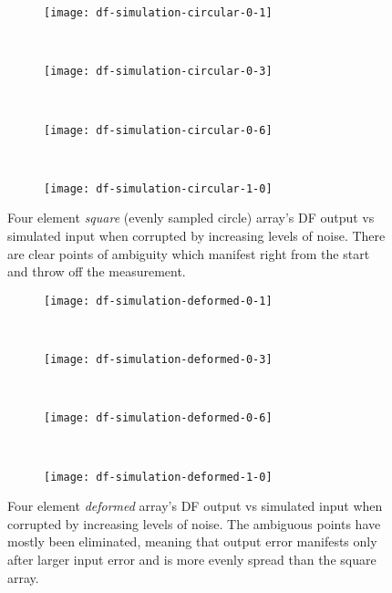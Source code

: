 \begin{figure}
  \begin{subfigure}{\textwidth}
    \centering
    \texttt{[image: df-simulation-circular-0-1]}
  \end{subfigure}\\[1em]
  \begin{subfigure}{\textwidth}
    \centering
    \texttt{[image: df-simulation-circular-0-3]}
  \end{subfigure}\\[1em]
  \begin{subfigure}{\textwidth}
    \centering
    \texttt{[image: df-simulation-circular-0-6]}
  \end{subfigure}\\[1em]
  \begin{subfigure}{\textwidth}
    \centering
    \texttt{[image: df-simulation-circular-1-0]}
  \end{subfigure}
  \caption{Four element \emph{square} (evenly sampled circle) array's DF output vs simulated input when corrupted by increasing levels of noise. There are clear points of ambiguity which manifest right from the start and throw off the measurement.}
  \label{fig:rf-front-end:circular-error-snapshots}
\end{figure}

\begin{figure}
  \begin{subfigure}{\textwidth}
    \centering
    \texttt{[image: df-simulation-deformed-0-1]}
  \end{subfigure}\\[1em]
  \begin{subfigure}{\textwidth}
    \centering
    \texttt{[image: df-simulation-deformed-0-3]}
  \end{subfigure}\\[1em]
  \begin{subfigure}{\textwidth}
    \centering
    \texttt{[image: df-simulation-deformed-0-6]}
  \end{subfigure}\\[1em]
  \begin{subfigure}{\textwidth}
    \centering
    \texttt{[image: df-simulation-deformed-1-0]}
  \end{subfigure}
  \caption{Four element \emph{deformed} array's DF output vs simulated input when corrupted by increasing levels of noise. The ambiguous points have mostly been eliminated, meaning that output error manifests only after larger input error and is more evenly spread than the square array.}
  \label{fig:rf-front-end:deformed-error-snapshots}
\end{figure}
